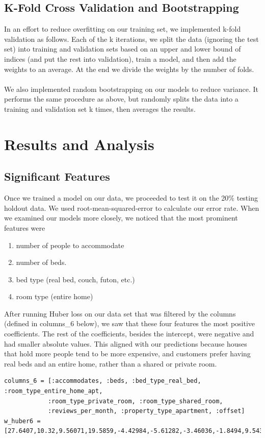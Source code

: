\documentclass{article}
\begin{document}
\subsection{K-Fold Cross Validation and Bootstrapping}
In an effort to reduce overfitting on our training set, we implemented k-fold validation as follows. Each of the k iterations, we split the data (ignoring the test set) into training and validation sets based on an upper and lower bound of indices (and put the rest into validation), train a model, and then add the weights to an average. At the end we divide the weights by the number of folds.
\\ \\
We also implemented random bootstrapping on our models to reduce variance. It performs the same procedure as above, but randomly splits the data into a training and validation set k times, then averages the results. 


\section{Results and Analysis}
\subsection{Significant Features}
Once we trained a model on our data, we proceeded to test it on the 20\% testing holdout data. We used root-mean-squared-error to calculate our error rate. When we examined our models more closely, we noticed that the most prominent features were 
\begin{enumerate}
\item number of people to accommodate
\item number of beds. 
\item bed type (real bed, couch, futon, etc.)
\item room type (entire home)
\end{enumerate}

After running Huber loss on our data set that was filtered by the columns (defined in columns\_6 below), we saw that these four features the most positive coefficients. The rest of the coefficients, besides the intercept, were negative and had smaller absolute values. This aligned with our predictions because houses that hold more people tend to be more expensive, and customers prefer having real beds and an entire home, rather than a shared or private room.
\begin{verbatim}
columns_6 = [:accommodates, :beds, :bed_type_real_bed, :room_type_entire_home_apt, 
    		:room_type_private_room, :room_type_shared_room, 
    		:reviews_per_month, :property_type_apartment, :offset]
w_huber6 = [27.6407,10.32,9.56071,19.5859,-4.42984,-5.61282,-3.46036,-1.8494,9.54327]
\end{verbatim}
\end{document}
